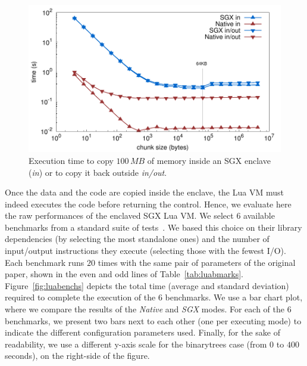 \begin{figure}[t!]
  \centering
  \includegraphics[width=\linewidth]{plots/memcpy/memcpy}
  \caption{Execution time to copy $100\,MB$ of memory inside an SGX enclave (\emph{in}) or to copy it back outside {\emph{in/out}.} }
  \label{fig:sgxmemcpy}
\end{figure}

Once the data and the code are copied inside the enclave, the Lua VM must indeed executes the code before returning the control. 
Hence, we evaluate here the raw performances of the enclaved SGX Lua VM.
We select $6$ available benchmarks from a standard suite of tests~\cite{bolz2015}.
We based this choice on their library dependencies (by selecting the most standalone ones) and the number of input/output instructions they execute (selecting those with the fewest I/O).
Each benchmark runs $20$ times with the same pair of parameters of the original paper, shown in the even and odd lines of Table~\ref{tab:luabmarks}.
Figure~\ref{fig:luabenchs} depicts the total time (average and standard deviation) required to complete the execution of the 6 benchmarks.
We use a bar chart plot, where we compare the results of the \emph{Native} and \emph{SGX} modes. 
For each of the $6$ benchmarks, we present two bars next to each other (one per executing mode) to indicate the different configuration parameters used.
Finally, for the sake of readability, we use a different y-axis scale for the \textsf{binarytrees} case (from $0$ to $400$\,seconds), on the right-side of the figure.

